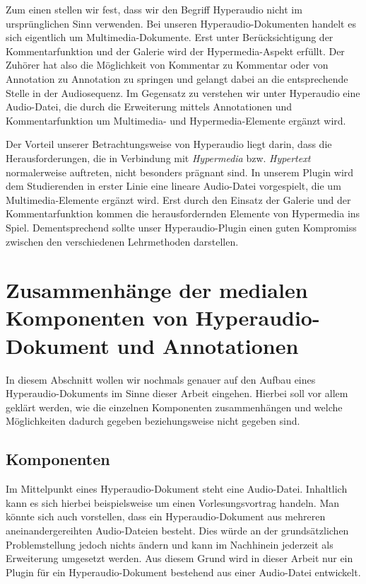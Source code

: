 Zum einen stellen wir fest, dass wir den Begriff Hyperaudio nicht im ursprünglichen Sinn verwenden. Bei unseren Hyperaudio-Dokumenten handelt es sich eigentlich um Multimedia-Dokumente. Erst unter Berücksichtigung der Kommentarfunktion und der Galerie wird der Hypermedia-Aspekt erfüllt. Der Zuhörer hat also die Möglichkeit von Kommentar zu Kommentar oder von Annotation zu Annotation zu springen und gelangt dabei an die entsprechende Stelle in der Audiosequenz. Im Gegensatz zu \cite{zumbach2006learning} verstehen wir unter Hyperaudio eine Audio-Datei, die durch die Erweiterung mittels Annotationen und Kommentarfunktion um Multimedia- und Hypermedia-Elemente ergänzt wird.

Der Vorteil unserer Betrachtungsweise von Hyperaudio liegt darin, dass die Herausforderungen, die in Verbindung mit \textit{Hypermedia} bzw. \textit{Hypertext} normalerweise auftreten, nicht besonders prägnant sind. In unserem Plugin wird dem Studierenden in erster Linie eine lineare Audio-Datei vorgespielt, die um Multimedia-Elemente ergänzt wird. Erst durch den Einsatz der Galerie und der Kommentarfunktion kommen die herausfordernden Elemente von Hypermedia ins Spiel. Dementsprechend sollte unser Hyperaudio-Plugin einen guten Kompromiss zwischen den verschiedenen Lehrmethoden darstellen.

\section{Zusammenhänge der medialen Komponenten von Hyperaudio-Dokument und Annotationen}
In diesem Abschnitt wollen wir nochmals genauer auf den Aufbau eines Hyperaudio-Dokuments im Sinne dieser Arbeit eingehen. Hierbei soll vor allem geklärt werden, wie die einzelnen Komponenten zusammenhängen und welche Möglichkeiten dadurch gegeben beziehungsweise nicht gegeben sind.

\subsection{Komponenten}
Im Mittelpunkt eines Hyperaudio-Dokument steht eine Audio-Datei. Inhaltlich kann es sich hierbei beispielsweise um einen Vorlesungsvortrag handeln. Man könnte sich auch vorstellen, dass ein Hyperaudio-Dokument aus mehreren aneinandergereihten Audio-Dateien besteht. Dies würde an der grundsätzlichen Problemstellung jedoch nichts ändern und kann im Nachhinein jederzeit als Erweiterung umgesetzt werden. Aus diesem Grund wird in dieser Arbeit nur ein Plugin für ein Hyperaudio-Dokument bestehend aus einer Audio-Datei entwickelt.

